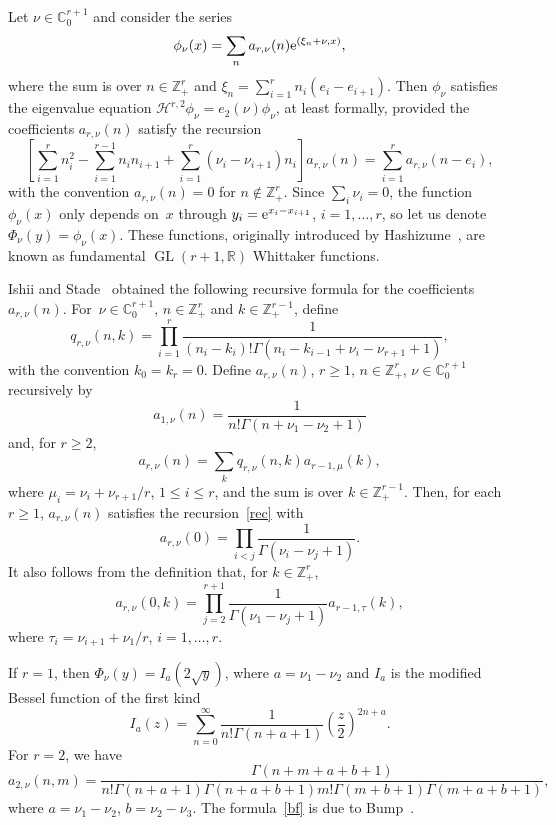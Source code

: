 \documentclass[pdftex]{sigma}
\theoremstyle{definition}
\newcommand{\C}{{\mathbb C}}
\newcommand\R{{\mathbb R}}
\newcommand\Z{{\mathbb Z}}
\renewcommand\H{{\mathcal H}}
\begin{document}
Let $\nu\in\C_0^{r+1}$ and consider the series
\[
\phi_\nu(x)=\sum_n a_{r,\nu}(n) {\rm e}^{(\xi_n+\nu,x)},
\]
where the sum is over $n\in \Z_+^{r}$ and
$\xi_n=\sum_{i=1}^{r} n_i (e_i-e_{i+1})$.
Then $\phi_\nu$ satisfies the eigenvalue equation
$\H^{r,2}\phi_\nu = e_2(\nu)\phi_\nu$,
at least formally, provided the coefficients $a_{r,\nu}(n)$ satisfy the recursion%
\begin{equation}\label{rec} \left[\sum_{i=1}^{r} n_i^2 - \sum_{i=1}^{r-1}n_i n_{i+1}
+\sum_{i=1}^{r} (\nu_i-\nu_{i+1}) n_i \right]
a_{r,\nu}(n) = \sum_{i=1}^{r} a_{r,\nu}(n-e_i),\end{equation}
with the convention $a_{r,\nu}(n) =0$ for $n\notin \Z_+^{r}$.
Since $\sum_i\nu_i=0$, the function $\phi_{\nu}(x)$ only depends on~$x$
through $y_i={\rm e}^{x_i-x_{i+1}}$, $i=1,\dots,r$, so let us denote $\Phi_\nu(y)=\phi_\nu(x)$.
These functions, originally introduced by Hashizume~\cite{h},
are known as fundamental $\operatorname{GL}(r+1,\R)$ Whittaker functions.

Ishii and Stade~\cite{is} obtained the following recursive formula
for the coefficients $a_{r,\nu}(n)$.
For~${\nu\in\C_0^{r+1}}$, $n\in \Z_+^{r}$ and $k\in \Z_+^{r-1}$, define
\[
q_{r,\nu}(n,k)=\prod_{i=1}^{r} \frac1{(n_i-k_i)! \Gamma(n_i-k_{i-1}+\nu_i-\nu_{r+1}+1)},
\]
with the convention $k_0=k_{r}=0$.
Define
$a_{r,\nu}(n)$, $r\ge 1$, $n\in \Z_+^{r}$, $\nu\in\C_0^{r+1}$ recursively by
\begin{equation}\label{def-a1} a_{1,\nu}(n) =\frac1{n! \Gamma(n+\nu_1-\nu_2+1)}\end{equation}
and, for $r\ge 2$,
\begin{equation}\label{def-ar}
a_{r,\nu}(n) =\sum_{k} q_{r,\nu}(n,k) a_{r-1,\mu}(k),
\end{equation}
where $\mu_i=\nu_i+\nu_{r+1}/r$, $1\le i\le r$, and the sum is over $k\in \Z_+^{r-1}$.
Then, for each $r\ge 1$,
$a_{r,\nu}(n)$ satisfies the recursion~\eqref{rec} with
\[ a_{r,\nu}(0) =\prod_{i<j}\frac{1}{\Gamma(\nu_i-\nu_j+1)}.\]
It also follows from the definition that, for $k\in\Z_+^r$,
\begin{equation}\label{ar0}
a_{r,\nu}(0,k)=\prod_{j=2}^{r+1} \frac{1}{\Gamma(\nu_1-\nu_j+1)} a_{r-1,\tau}(k),
\end{equation}
where $\tau_i=\nu_{i+1}+\nu_1/r$, $i=1,\dots,r$.

If $r=1$, then
$\Phi_\nu(y)=I_a\left(2\sqrt{y}\right)$,
where $a=\nu_1-\nu_2$ and $I_a$ is the modified Bessel function of the first kind
\[I_a(z)=\sum_{n=0}^\infty \frac1{n! \Gamma(n+a+1)} \left(\frac{z}{2}\right)^{2n+a}.\]
For $r=2$, we have
\begin{equation}\label{bf}
a_{2,\nu}(n,m)=\frac{\Gamma(n+m+a+b+1)}{n! \Gamma(n+a+1) \Gamma(n+a+b+1) m! \Gamma(m+b+1) \Gamma(m+a+b+1)},
\end{equation}
where $a=\nu_1-\nu_2$, $b=\nu_2-\nu_3$. The formula~\eqref{bf} is due to Bump~\cite{bump}.
\end{document}

